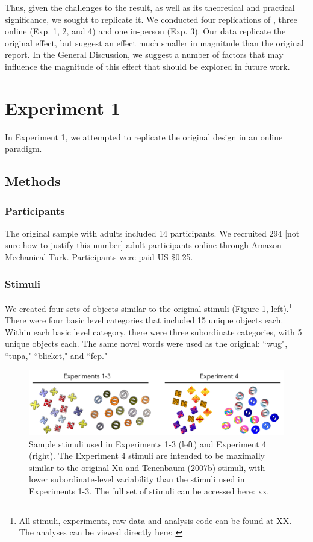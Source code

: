\documentclass[man]{apa2}
\begin{document}
Thus, given the challenges to the  result, as well as its theoretical and practical significance, we sought to replicate it.  We conducted four replications of , three online (Exp. 1, 2, and 4) and one in-person (Exp. 3).  Our data replicate the original effect, but suggest an effect much smaller in magnitude than the original report. In the General Discussion, we suggest a number of factors that may influence the magnitude of this effect that should be explored in future work.


  
\section{Experiment 1} 
In Experiment 1, we attempted to replicate the original design in an online paradigm. 

\subsection{Methods}
\subsubsection{Participants} 
The original sample with adults included 14 participants. We recruited 294 [not sure how to justify this number] adult participants online through Amazon Mechanical Turk. Participants were paid US \$0.25. 
\subsubsection{Stimuli}
We created four sets of objects similar to the original  stimuli (Figure \ref{fig:stims}, left).\footnote{All stimuli, experiments, raw data and analysis code can be found at \url{XX}. The analyses can be viewed directly here: \url{}} There were four basic level categories that included 15 unique objects each. Within each basic level category, there were three subordinate categories, with 5 unique objects each. The same novel words were used as the original: ``wug", ``tupa," ``blicket," and ``fep."
\begin{figure}[t]
 \begin{center} 
  \includegraphics[width=5in]{figures/stims.png} 
  \caption{ \label{fig:stims} Sample stimuli used in Experiments 1-3 (left) and Experiment 4 (right). The Experiment 4 stimuli are intended to be maximally similar to the original Xu and Tenenbaum (2007b) stimuli, with lower subordinate-level variability than the stimuli used in Experiments 1-3. The full set of stimuli can be accessed here: xx.  } 
 \end{center} 
\end{figure}	
 
\end{document}
